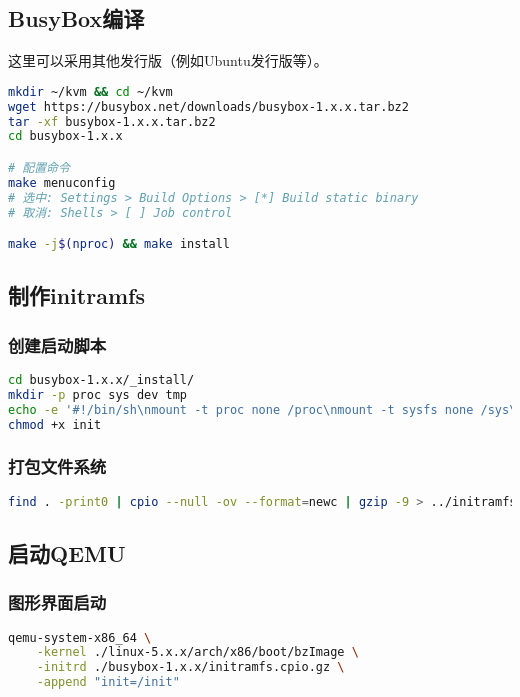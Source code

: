 \subsection{BusyBox编译}
这里可以采用其他发行版（例如Ubuntu发行版等）。
\begin{lstlisting}[language=bash]
mkdir ~/kvm && cd ~/kvm
wget https://busybox.net/downloads/busybox-1.x.x.tar.bz2
tar -xf busybox-1.x.x.tar.bz2
cd busybox-1.x.x

# 配置命令
make menuconfig
# 选中: Settings > Build Options > [*] Build static binary
# 取消: Shells > [ ] Job control

make -j$(nproc) && make install
\end{lstlisting}

\subsection{制作initramfs}
\subsubsection{创建启动脚本}
\begin{lstlisting}[language=bash]
cd busybox-1.x.x/_install/
mkdir -p proc sys dev tmp
echo -e '#!/bin/sh\nmount -t proc none /proc\nmount -t sysfs none /sys\nmount -t tmpfs none /tmp\nmount -t devtmpfs none /dev\necho "Hello Linux!"\nexec /bin/sh' > init
chmod +x init
\end{lstlisting}

\subsubsection{打包文件系统}
\begin{lstlisting}[language=bash]
find . -print0 | cpio --null -ov --format=newc | gzip -9 > ../initramfs.cpio.gz
\end{lstlisting}

\subsection{启动QEMU}
\subsubsection{图形界面启动}
\begin{lstlisting}[language=bash]
qemu-system-x86_64 \
    -kernel ./linux-5.x.x/arch/x86/boot/bzImage \
    -initrd ./busybox-1.x.x/initramfs.cpio.gz \
    -append "init=/init"
\end{lstlisting}

